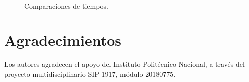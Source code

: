 \documentclass[conference]{IEEEtran}
\begin{document}
  \begin{figure}[!t]
    \centering
    \\
    \caption{Comparaciones de tiempos.}
    \label{fig_sim}
  \end{figure}

  \section*{Agradecimientos}

  Los autores agradecen el apoyo del Instituto Politécnico Nacional, a través
  del proyecto multidisciplinario SIP 1917, módulo 20180775.

  
  
\end{document}
